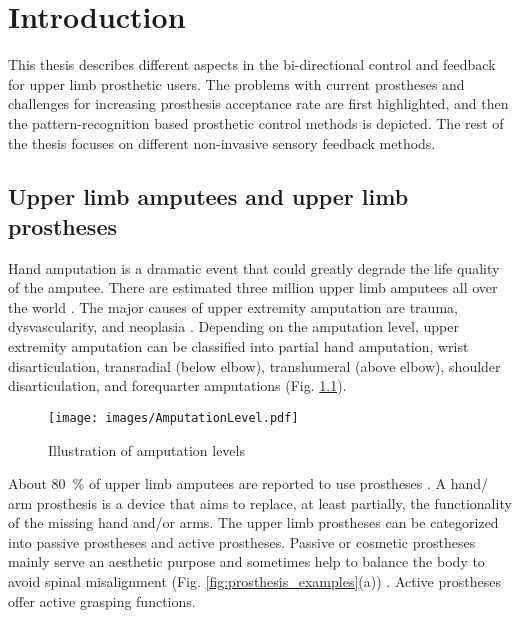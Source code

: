 \chapter{Introduction}


This thesis describes different aspects in the bi-directional control and feedback for upper limb prosthetic users. The problems with current prostheses and challenges for increasing prosthesis acceptance rate are first highlighted, and then the pattern-recognition based prosthetic control methods is depicted. The rest of the thesis focuses on different non-invasive sensory feedback methods.

\section{Upper limb amputees and upper limb prostheses }
Hand amputation is a dramatic event that could greatly degrade the life quality of the amputee. There are estimated three million upper limb amputees all over the world \cite{micera2016staying}. 
The major causes of upper extremity amputation are trauma, dysvascularity, and neoplasia \cite{raichle2008prosthesis}. Depending on the amputation level, upper extremity amputation can be classified into partial hand amputation, wrist disarticulation, transradial (below elbow), transhumeral (above elbow), shoulder disarticulation, and forequarter amputations (Fig. \ref{fig:amputation_level}). 


 \begin{figure}[hbt!]
    \centering
       \texttt{[image: images/AmputationLevel.pdf]}
        \caption{Illustration of amputation levels \cite{cordella2016literature}}
        \label{fig:amputation_level}
\end{figure}


About \SI{80}{\%} of upper limb amputees are reported to use prostheses \cite{ostlie2012prosthesis}. A hand/ arm prosthesis is a device that aims to replace, at least partially, the functionality of the missing hand and/or arms. The upper limb prostheses can be categorized into passive prostheses and active prostheses. Passive or cosmetic prostheses mainly serve an aesthetic purpose and sometimes help to balance the body to avoid spinal misalignment (Fig. \ref{fig:prosthesis_examples}(a)) \cite{castelli2017grasping}. Active prostheses offer active grasping functions. 

